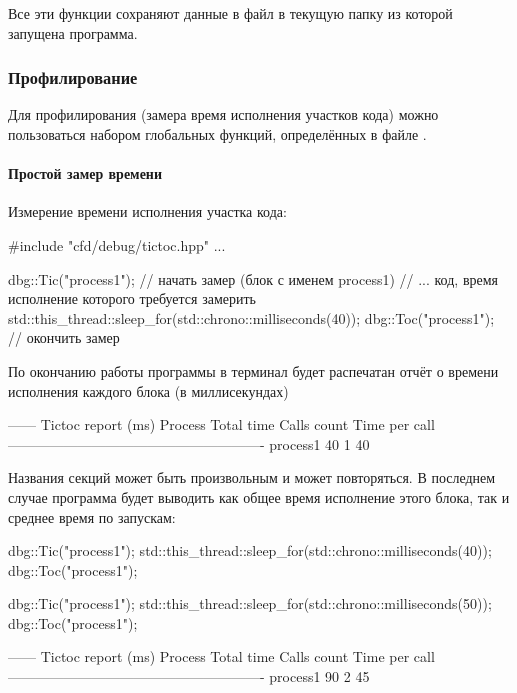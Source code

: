 Все эти функции сохраняют данные в файл  в текущую папку из которой запущена программа.

\subsubsection{Профилирование}
\label{sec:dbg-tictoc}
Для профилирования (замера время исполнения участков кода) можно пользоваться
набором глобальных функций, определённых в файле
.

\paragraph{Простой замер времени}
Измерение времени исполнения участка кода:
\begin{cppcode}
#include "cfd/debug/tictoc.hpp"
...

dbg::Tic("process1");   // начать замер (блок с именем process1)
// ... код, время исполнение которого требуется замерить
std::this_thread::sleep_for(std::chrono::milliseconds(40));
dbg::Toc("process1");   // окончить замер
\end{cppcode}

По окончанию работы программы в терминал будет распечатан
отчёт о времени исполнения каждого блока (в миллисекундах)
\begin{shelloutput}
------ Tictoc report (ms)
Process        Total time    Calls count  Time per call
-------------------------------------------------------
process1               40              1             40
\end{shelloutput}

Названия секций может быть произвольным и может повторяться. В последнем случае
программа будет выводить как общее время исполнение этого блока, так и среднее время по запускам:

\begin{cppcode}
dbg::Tic("process1");
std::this_thread::sleep_for(std::chrono::milliseconds(40));
dbg::Toc("process1");

dbg::Tic("process1");
std::this_thread::sleep_for(std::chrono::milliseconds(50));
dbg::Toc("process1");
\end{cppcode}

\begin{shelloutput}
------ Tictoc report (ms)
Process        Total time    Calls count  Time per call
-------------------------------------------------------
process1               90              2             45
\end{shelloutput}

